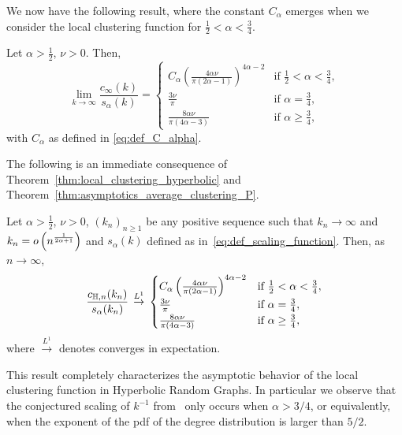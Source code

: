 We now have the following result, where the constant $C_\alpha$ emerges when we consider the local clustering function for $\frac{1}{2} < \alpha < \frac{3}{4}$.

\begin{theorem}\label{thm:asymptotics_average_clustering_P}
Let $\alpha > \frac{1}{2}$, $\nu > 0$. Then,
\[
	\lim_{k \to \infty} \frac{c_\infty(k)}{s_\alpha(k)} 
	= \begin{cases}
			C_\alpha \left(\frac{4\alpha \nu}{\pi\left(2\alpha - 1\right)}\right)^{4\alpha - 2}
			&\mbox{if } \frac{1}{2} < \alpha < \frac{3}{4},\\
			\frac{3 \nu}{\pi} &\mbox{if } \alpha = \frac{3}{4},\\
			\frac{8\alpha \nu}{\pi\left(4\alpha - 3\right)} &\mbox{if } \alpha \ge \frac{3}{4},
	\end{cases}
\]
with $C_\alpha$ as defined in \eqref{eq:def_C_alpha}.
\end{theorem}

The following is an immediate consequence of Theorem~\ref{thm:local_clustering_hyperbolic} and Theorem~\ref{thm:asymptotics_average_clustering_P}.

\begin{corollary}
\label{cor:asymptotic_local_clustering_hyperbolic}
Let $\alpha > \frac{1}{2}$, $\nu > 0$, $(k_n)_{n \ge 1}$ be any positive sequence such that $k_n \to \infty$ and $k_n = o\left(n^{\frac{1}{2\alpha + 1}}\right)$ and $s_\alpha(k)$ defined as in~\eqref{eq:def_scaling_function}. Then, as $n \to \infty$,
\[
	\frac{c_{\mathbb{H},n}(k_n)}{s_\alpha(k_n)} \, \stackrel{L^1}{\rightarrow} \, 
	\begin{cases}
				C_\alpha \left(\frac{4\alpha \nu}{\pi\left(2\alpha - 1\right)}\right)^{4\alpha - 2}
				&\mbox{if } \frac{1}{2} < \alpha < \frac{3}{4},\\
				\frac{3\nu}{\pi} &\mbox{if } \alpha = \frac{3}{4},\\
				\frac{8\alpha \nu}{\pi\left(4\alpha - 3\right)} &\mbox{if } \alpha \ge \frac{3}{4},
		\end{cases}
\]
where $\stackrel{L^1}{\to}$ denotes converges in expectation.
\end{corollary}

This result completely characterizes the asymptotic behavior of the local clustering function in Hyperbolic Random Graphs. In particular we observe that the conjectured scaling of $k^{-1}$ from~\cite{krioukov2010hyperbolic} only occurs when $\alpha > 3/4$, or equivalently, when the exponent of the pdf of the degree distribution is larger than $5/2$. 

